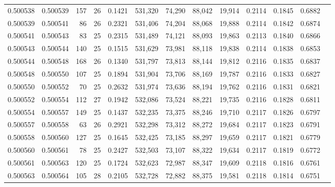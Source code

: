 \begin{tabular}{rrrrrrrrrrrrr}
0.500538 & 0.500539 & 157 &  26 &                                     0.1421 & 531,320 &  74,290 &  88,042 &  19,914 & 0.2114 & 0.1845 & 0.6882 \\
0.500539 & 0.500541 &  86 &  26 &                                     0.2321 & 531,406 &  74,204 &  88,068 &  19,888 & 0.2114 & 0.1842 & 0.6874 \\
0.500541 & 0.500543 &  83 &  25 &                                     0.2315 & 531,489 &  74,121 &  88,093 &  19,863 & 0.2113 & 0.1840 & 0.6866 \\
0.500543 & 0.500544 & 140 &  25 &                                     0.1515 & 531,629 &  73,981 &  88,118 &  19,838 & 0.2114 & 0.1838 & 0.6853 \\
0.500544 & 0.500548 & 168 &  26 &                                     0.1340 & 531,797 &  73,813 &  88,144 &  19,812 & 0.2116 & 0.1835 & 0.6837 \\
0.500548 & 0.500550 & 107 &  25 &                                     0.1894 & 531,904 &  73,706 &  88,169 &  19,787 & 0.2116 & 0.1833 & 0.6827 \\
0.500550 & 0.500552 &  70 &  25 &                                     0.2632 & 531,974 &  73,636 &  88,194 &  19,762 & 0.2116 & 0.1831 & 0.6821 \\
0.500552 & 0.500554 & 112 &  27 &                                     0.1942 & 532,086 &  73,524 &  88,221 &  19,735 & 0.2116 & 0.1828 & 0.6811 \\
0.500554 & 0.500557 & 149 &  25 &                                     0.1437 & 532,235 &  73,375 &  88,246 &  19,710 & 0.2117 & 0.1826 & 0.6797 \\
0.500557 & 0.500558 &  63 &  26 &                                     0.2921 & 532,298 &  73,312 &  88,272 &  19,684 & 0.2117 & 0.1823 & 0.6791 \\
0.500558 & 0.500560 & 127 &  25 &                                     0.1645 & 532,425 &  73,185 &  88,297 &  19,659 & 0.2117 & 0.1821 & 0.6779 \\
0.500560 & 0.500561 &  78 &  25 &                                     0.2427 & 532,503 &  73,107 &  88,322 &  19,634 & 0.2117 & 0.1819 & 0.6772 \\
0.500561 & 0.500563 & 120 &  25 &                                     0.1724 & 532,623 &  72,987 &  88,347 &  19,609 & 0.2118 & 0.1816 & 0.6761 \\
0.500563 & 0.500564 & 105 &  28 &                                     0.2105 & 532,728 &  72,882 &  88,375 &  19,581 & 0.2118 & 0.1814 & 0.6751 \\

\end{tabular}

